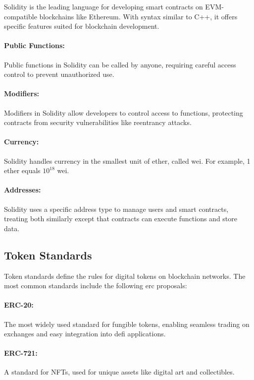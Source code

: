 Solidity is the leading language for developing smart contracts on
EVM-compatible blockchains like Ethereum. With syntax similar to C++, it offers
specific features suited for blockchain development.

\paragraph{Public Functions:}
Public functions in Solidity can be called by anyone, requiring careful access
control to prevent unauthorized use.

\paragraph{Modifiers:}
Modifiers in Solidity allow developers to control access to functions,
protecting contracts from security vulnerabilities like reentrancy attacks.

\paragraph{Currency:}
Solidity handles currency in the smallest unit of ether, called wei. For
example, 1 ether equals $10^{18}$ wei.

\paragraph{Addresses:}
Solidity uses a specific address type to manage users and smart contracts,
treating both similarly except that contracts can execute functions and store
data.

\subsection{Token Standards}\label{subsec:token_standards}

Token standards define the rules for digital tokens on blockchain networks. The
most common standards include the following \gls{erc} proposals:

\paragraph{ERC-20:}
The most widely used standard for fungible tokens, enabling seamless trading on
exchanges and easy integration into \gls{defi} applications.

\paragraph{ERC-721:}
A standard for NFTs, used for unique assets like digital art and collectibles.

